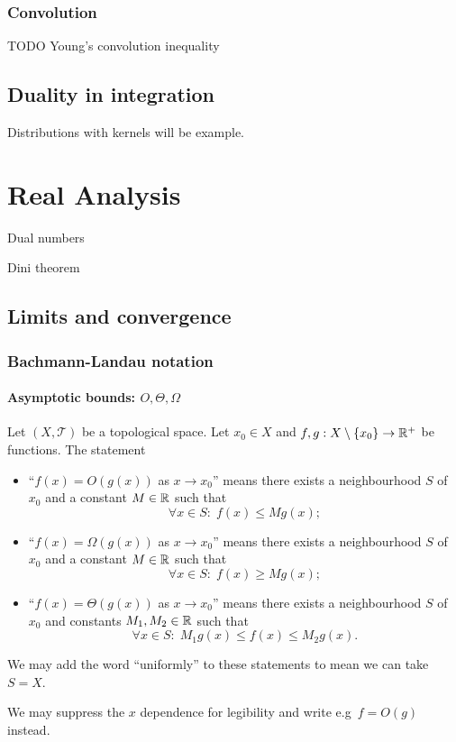 \subsection{Convolution}
TODO Young's convolution inequality

\section{Duality in integration}
Distributions with kernels will be example.

\chapter{Real Analysis}
Dual numbers

Dini theorem

\section{Limits and convergence}

\subsection{Bachmann-Landau notation}
\subsubsection{Asymptotic bounds: $O, \Theta, \Omega$}
\begin{definition}
Let $(X,\mathcal{T})$ be a topological space. Let $x_0 \in X$ and $f,g: X\setminus\{x_0\}\to \mathbb{R}^+$ be functions. The statement
\begin{itemize}
\item ``$f(x) = O(g(x))$ as $x\to x_0$'' means there exists a neighbourhood $S$ of $x_0$ and a constant $M\in\mathbb{R}$ such that
\[ \forall x\in S:\; f(x) \leq Mg(x); \]
\item ``$f(x) = \Omega(g(x))$ as $x\to x_0$'' means there exists a neighbourhood $S$ of $x_0$ and a constant $M\in\mathbb{R}$ such that
\[ \forall x\in S:\; f(x) \geq Mg(x); \]
\item ``$f(x) = \Theta(g(x))$ as $x\to x_0$'' means there exists a neighbourhood $S$ of $x_0$ and constants $M_1,M_2\in\mathbb{R}$ such that
\[ \forall x\in S:\; M_1g(x) \leq f(x) \leq M_2g(x). \]
\end{itemize}
We may add the word ``uniformly'' to these statements to mean we can take $S=X$.

We may suppress the $x$ dependence for legibility and write e.g\ $f = O(g)$ instead.
\end{definition}

